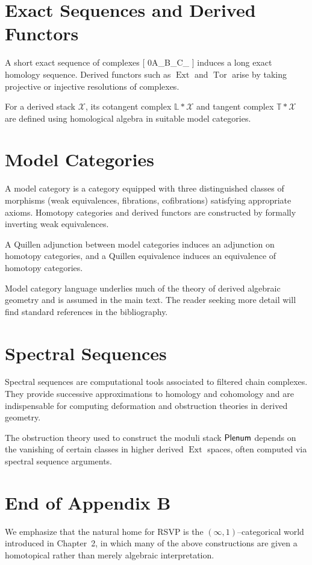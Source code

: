 \section{Exact Sequences and Derived Functors}

A short exact sequence of complexes
[
0\to A_\bullet\to B_\bullet\to C_\bullet{}
]
induces a long exact homology sequence. Derived functors such as $\operatorname{Ext}$ and $\operatorname{Tor}$ arise by taking projective or injective resolutions of complexes.

\begin{remark}
For a derived stack $\mathcal X$, its cotangent complex $\mathbb{L}*\mathcal X$ and tangent complex $\mathbb{T}*\mathcal X$ are defined using homological algebra in suitable model categories.
\end{remark}

\section{Model Categories}

A model category is a category equipped with three distinguished classes of morphisms (weak equivalences, fibrations, cofibrations) satisfying appropriate axioms. Homotopy categories and derived functors are constructed by formally inverting weak equivalences.

\begin{definition}
A Quillen adjunction between model categories induces an adjunction on homotopy categories, and a Quillen equivalence induces an equivalence of homotopy categories.
\end{definition}

Model category language underlies much of the theory of derived algebraic geometry and is assumed in the main text.  The reader seeking more detail will find standard references in the bibliography.

\section{Spectral Sequences}

Spectral sequences are computational tools associated to filtered chain complexes. They provide successive approximations to homology and cohomology and are indispensable for computing deformation and obstruction theories in derived geometry.

\begin{remark}
The obstruction theory used to construct the moduli stack $\mathsf{Plenum}$ depends on the vanishing of certain classes in higher derived $\operatorname{Ext}$ spaces, often computed via spectral sequence arguments.
\end{remark}

\section{End of Appendix B}

We emphasize that the natural home for RSVP is the $(\infty,1)$--categorical world introduced in Chapter~2, in which many of the above constructions are given a homotopical rather than merely algebraic interpretation.

